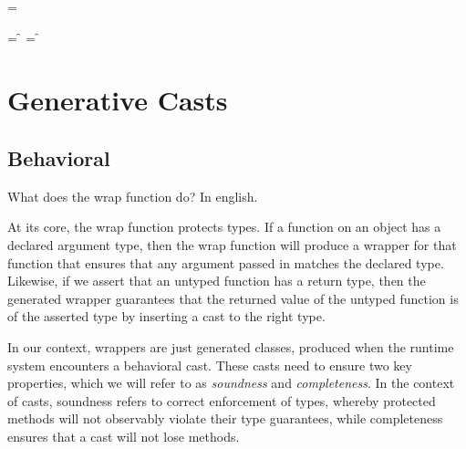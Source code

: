 \documentclass[a4paper,UKenglish,final]{tex/lipics-v2016}
\begin{document}

\names{\Mtype\m\t\t} = \m

\names{\Mtype\f\t\t} = \f

\names{\Mtype\f{}\t} = \f


% 
% 
% 
% 
% 
\newcommand{\getmtype}{\text{mtype}}
% 
% 

\section{Generative Casts}

\subsection{Behavioral}



\hrulefill

\begin{mathpar}
\end{mathpar}

What does the wrap function do? In english.

At its core, the wrap function protects types. If a function on an object has a declared argument type, then the wrap function will produce a wrapper for that function that ensures that any argument passed in matches the declared type. Likewise, if we assert that an untyped function has a return type, then the generated wrapper guarantees that the returned value of the untyped function is of the asserted type by inserting a cast to the right type.

In our context, wrappers are just generated classes, produced when the runtime system encounters a behavioral cast. These casts need to ensure two key properties, which we will refer to as \emph{soundness} and \emph{completeness}. In the context of casts, soundness refers to correct enforcement of types, whereby protected methods will not observably violate their type guarantees, while completeness ensures that a cast will not lose methods.
\end{document}
